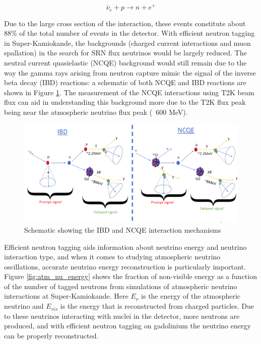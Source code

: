 \begin{equation}
    \bar{\nu}_{e}+p \rightarrow n+e^{+}
\label{eq:IBD_equation}
\end{equation}

Due to the large cross section of the interaction, these events constitute about 88\% of the total number of events in the detector. With efficient neutron tagging in Super-Kamiokande, the backgrounds (charged current interactions and muon spallation) in the search for SRN flux neutrinos would be largely reduced. The neutral current quasielastic (NCQE) background would still remain due to the way the gamma rays arising from neutron capture mimic the signal of the inverse beta decay (IBD) reactions: a schematic of both NCQE and IBD reactions are shown in Figure \ref{fig:NCQE_IBD}. The measurement of the NCQE interactions using T2K beam flux can aid in understanding this background more due to the T2K flux peak being near the atmospheric neutrino flux peak (~600 MeV). 


\begin{figure}[h!]
    \includegraphics[scale=0.4]{Figures/schematic.png}
\caption{Schematic showing the IBD and NCQE interaction mechanisms}
\label{fig:NCQE_IBD}
\end{figure}


Efficient neutron tagging aids information about neutrino energy and neutrino interaction type, and when it comes to studying atmospheric neutrino oscillations, accurate neutrino energy reconstruction is particularly important. Figure \ref{fig:atm_nu_energy} shows the fraction of non-visible energy as a function of the number of tagged neutrons from simulations of atmospheric neutrino interactions at Super-Kamiokande. Here $E_{\nu}$ is the energy of the atmospheric neutrino and $E_{vis}$ is the energy that is reconstructed from charged particles. Due to these neutrinos interacting with nuclei in the detector, more neutrons are produced, and with efficient neutron tagging on gadolinium the neutrino energy can be properly reconstructed. 

